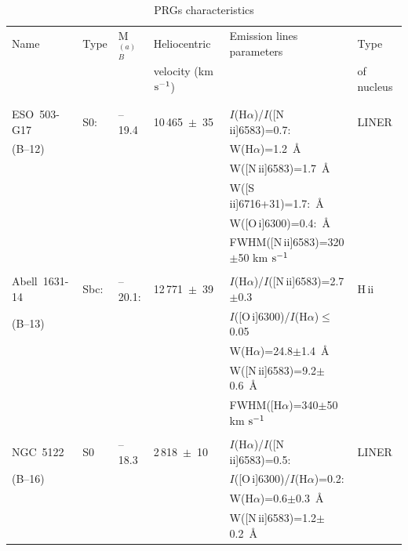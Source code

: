 \setcounter{table}{1}
\begin{table}
\caption[]{PRGs characteristics}
\label{charsum}
\begin{tabular}{llllll}
\\
\hline
Name & Type  & M$_B^{(a)}$ &Heliocentric          & Emission lines parameters& Type \\
     &       &       &velocity (km $\rm s^{-1}$)       &               & of nucleus \\
\hline \\
     &                                  &                &                \\
ESO~503-G17& S0: & --19.4&10\,465~$\pm$~35        &$I$(H$\alpha$)/$I$([N\,{\sc ii}]6583)=0.7: & LINER \\
(B--12)  &     &&                   &W(H$\alpha$)=1.2~\AA    &     \\
           &     &&                   &W([N\,{\sc ii}]6583)=1.7~\AA    &     \\
	   &     &&                   &W([S\,{\sc ii}]6716+31)=1.7:~\AA & \\
	   &     &&                   &W([O\,{\sc i}]6300)=0.4:~\AA & \\
&     &&                   &FWHM([N\,{\sc ii}]6583)=320$\pm$50 km $\rm s^{-1}$ & \\
     &           &&                   &                &                \\
Abell~1631-14& Sbc: & --20.1:&12\,771~$\pm$~39 &$I$(H$\alpha$)/$I$([N\,{\sc ii}]6583)=2.7$\pm$0.3 & H\,{\sc ii} \\
(B--13)  &      &&  & $I$([O\,{\sc i}]6300)/$I$(H$\alpha$)$\leq$0.05 & \\
         &    &&   & W(H$\alpha$)=24.8$\pm$1.4~\AA &  \\
         &    &&   & W([N\,{\sc ii}]6583)=9.2$\pm$0.6~\AA &  \\
	 &    &&   & FWHM([H$\alpha$)=340$\pm$50 km $\rm s^{-1}$ & \\
     &        &&   &                                     &        \\
NGC~5122 & S0 & --18.3&2\,818~$\pm$~10      & $I$(H$\alpha$)/$I$([N\,{\sc ii}]6583)=0.5: & LINER         \\
(B--16)  &      &&  & $I$([O\,{\sc i}]6300)/$I$(H$\alpha$)=0.2: & \\
         &      &&  & W(H$\alpha$)=0.6$\pm$0.3~\AA &  \\
         &      &&  & W([N\,{\sc ii}]6583)=1.2$\pm$0.2~\AA &  \\

\end{tabular}
\end{table}
